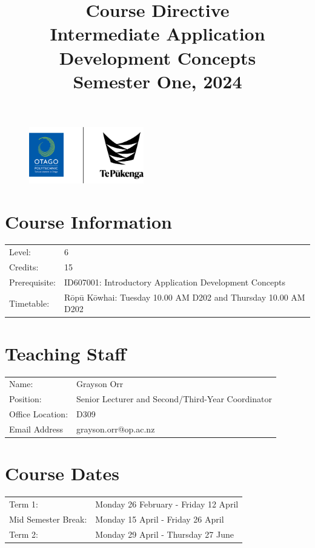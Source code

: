 \documentclass{article}
\author{}
\begin{document}
\begin{figure}
	\centering
	\includegraphics[width=50mm]{../img/logo.png}
\end{figure} 

\title{Course Directive\\Intermediate Application Development Concepts\\Semester One, 2024}
\date{}
\maketitle

\section*{Course Information}
\begin{tabular}{ll}
	Level:        & 6 \\
	Credits:      & 15                                                             \\
	Prerequisite: & ID607001: Introductory Application Development Concepts                                 \\
	Timetable:    & Rōpū Kōwhai: Tuesday 10.00 AM D202 and Thursday 10.00 AM D202 \\ 
\end{tabular} 

\section*{Teaching Staff}
\begin{tabular}{ll}
	Name:            & Grayson Orr                           \\
	Position:        & Senior Lecturer and Second/Third-Year Coordinator\\
	Office Location: & D309                                 \\
	Email Address    & grayson.orr@op.ac.nz                    
\end{tabular}

\section*{Course Dates}
\begin{tabular}{ll}
	Term 1:           & Monday 26 February - Friday 12 April  \\
	Mid Semester Break: &  Monday 15 April  - Friday 26 April     \\
	Term 2:             & Monday 29 April - Thursday 27 June       \\
\end{tabular}
\end{document}

